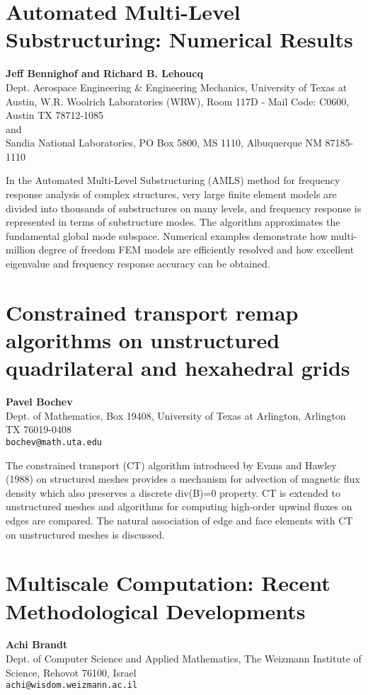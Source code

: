 \documentclass[11pt]{article}
\newcommand{\nextab}[4]{
	\section{#2}
	{\bf #1} \\ \nopagebreak
	{#3} \\ \nopagebreak
	{\tt #4} \nopagebreak
	}
\begin{document}

\nextab
{Jeff Bennighof and Richard B. Lehoucq}
{Automated Multi-Level Substructuring: Numerical Results}
{Dept. Aerospace Engineering \& Engineering Mechanics,
University of Texas at Austin,
W.R. Woolrich Laboratories (WRW), Room 117D - Mail Code: C0600,
Austin TX 78712-1085
\\ and \\
Sandia National Laboratories, PO Box 5800, MS 1110, Albuquerque NM 87185-1110
}{}


In the Automated Multi-Level Substructuring (AMLS) method for
frequency response analysis of complex structures, very large
finite element models are divided into thousands of
substructures on many levels, and frequency response is
represented in terms of substructure modes. The algorithm
approximates the fundamental global mode subspace.  Numerical
examples demonstrate how multi-million degree of freedom FEM
models are efficiently resolved and how excellent eigenvalue and
frequency response accuracy can be obtained.





\nextab
{Pavel Bochev}
{Constrained transport remap algorithms on unstructured quadrilateral and hexahedral grids}
{Dept. of Mathematics, Box 19408, University of Texas at Arlington, Arlington TX 76019-0408}
{bochev@math.uta.edu}


The constrained transport (CT) algorithm introduced by Evans and Hawley
(1988) on structured meshes provides a mechanism for advection of magnetic
flux density which also preserves a discrete div(B)=0 property. CT is
extended to unstructured meshes and algorithms for computing high-order
upwind fluxes on edges are compared. The natural association of edge and
face elements with CT on unstructured meshes is discussed.





\nextab
{Achi Brandt}
{Multiscale Computation: Recent Methodological Developments}
{Dept. of Computer Science and Applied Mathematics, The Weizmann Institute of Science, Rehovot 76100, Israel}
{achi@wisdom.weizmann.ac.il}
\end{document}
